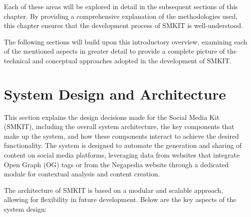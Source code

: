 Each of these areas will be explored in detail in the subsequent sections of this chapter. By providing a comprehensive explanation of the methodologies used, this chapter ensures that the development process of SMKIT is well-understood.

The following sections will build upon this introductory overview, examining each of the mentioned aspects in greater detail to provide a complete picture of the technical and conceptual approaches adopted in the development of SMKIT.


\section{System Design and Architecture}
\label{sec:system_design_and_architecture}
This section explains the design decisions made for the Social Media Kit (SMKIT), including the overall system architecture, the key components that make up the system, and how these components interact to achieve the desired functionality. The system is designed to automate the generation and sharing of content on social media platforms, leveraging data from websites that integrate Open Graph (OG) tags or from the Negapedia website through a dedicated module for contextual analysis and content creation.

The architecture of SMKIT is based on a modular and scalable approach, allowing for flexibility in future development. Below are the key aspects of the system design:

